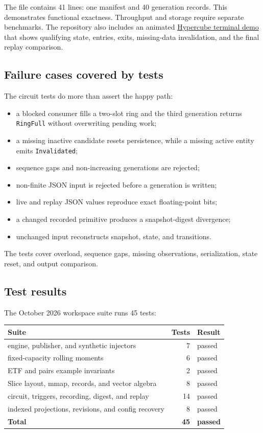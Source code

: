 \documentclass{strategynet-journal}
\newcommand{\SLICE}{\textsf{Slice}}
\begin{document}
The file contains 41 lines: one manifest and 40 generation records.  This
demonstrates functional exactness.  Throughput and storage require separate benchmarks.
The repository also includes an animated
\href{https://github.com/ingvor-restrat/hypercube/blob/main/docs/markup/circuit-replay.gif}
{Hypercube terminal demo} that shows qualifying state, entries, exits,
missing-data invalidation, and the final replay comparison.

\subsection{Failure cases covered by tests}

The circuit tests do more than assert the happy path:
\begin{itemize}
  \item a blocked consumer fills a two-slot ring and the third generation
        returns \texttt{RingFull} without overwriting pending work;
  \item a missing inactive candidate resets persistence, while a missing active
        entity emits \texttt{Invalidated};
  \item sequence gaps and non-increasing generations are rejected;
  \item non-finite JSON input is rejected before a generation is written;
  \item live and replay JSON values reproduce exact floating-point bits;
  \item a changed recorded primitive produces a snapshot-digest divergence;
  \item unchanged input reconstructs snapshot, state, and transitions.
\end{itemize}

The tests cover overload, sequence gaps, missing observations, serialization,
state reset, and output comparison.

\subsection{Test results}

The October 2026 workspace suite runs 45 tests:
\begin{center}
\begin{tabularx}{0.86\textwidth}{@{}X r l@{}}
\toprule
Suite & Tests & Result \\
\midrule
engine, publisher, and synthetic injectors & 7 & passed \\
fixed-capacity rolling moments & 6 & passed \\
ETF and pairs example invariants & 2 & passed \\
\SLICE{} layout, mmap, records, and vector algebra & 8 & passed \\
circuit, triggers, recording, digest, and replay & 14 & passed \\
indexed projections, revisions, and config recovery & 8 & passed \\
\midrule
\textbf{Total} & \textbf{45} & \textbf{passed} \\
\bottomrule
\end{tabularx}
\end{center}
\end{document}
